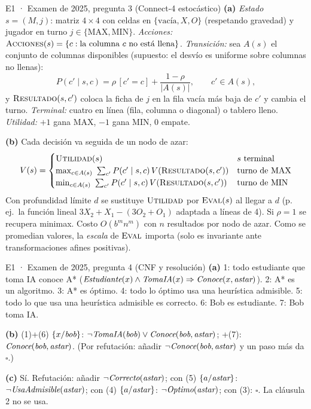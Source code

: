 \begin{solucion}{E1 · Examen de 2025, pregunta 3 (Connect-4 estocástico)}
\textbf{(a)} \emph{Estado} $s=(M,j)$: matriz $4\times4$ con celdas en $\{\text{vacía},X,O\}$ (respetando gravedad) y
jugador en turno $j\in\{\text{MAX},\text{MIN}\}$. \emph{Acciones:} $\textsc{Acciones}(s)=\{c: \text{la columna } c \text{ no está llena}\}$.
\emph{Transición:} sea $A(s)$ el conjunto de columnas disponibles (supuesto: el desvío es uniforme sobre
columnas no llenas):
\[P(c'\mid s,c)=\rho\,[c'=c]+\frac{1-\rho}{|A(s)|},\qquad c'\in A(s),\]
y $\textsc{Resultado}(s,c')$ coloca la ficha de $j$ en la fila vacía más baja de $c'$ y cambia el turno.
\emph{Terminal:} cuatro en línea (fila, columna o diagonal) o tablero lleno. \emph{Utilidad:} $+1$ gana MAX, $-1$
gana MIN, $0$ empate.

\textbf{(b)} Cada decisión va seguida de un nodo de azar:
\[V(s)=\begin{cases}
\textsc{Utilidad}(s) & s \text{ terminal}\\
\max_{c\in A(s)}\ \sum_{c'}P(c'\mid s,c)\,V(\textsc{Resultado}(s,c')) & \text{turno de MAX}\\
\min_{c\in A(s)}\ \sum_{c'}P(c'\mid s,c)\,V(\textsc{Resultado}(s,c')) & \text{turno de MIN}
\end{cases}\]
Con profundidad límite $d$ se sustituye $\textsc{Utilidad}$ por $\textsc{Eval}(s)$ al llegar a $d$ (p.\,ej.\ la
función lineal $3X_2+X_1-(3O_2+O_1)$ adaptada a líneas de 4). Si $\rho=1$ se recupera minimax. Costo
$O(b^m n^m)$ con $n$ resultados por nodo de azar. Como se promedian valores, la \emph{escala} de
$\textsc{Eval}$ importa (solo es invariante ante transformaciones afines positivas).
\end{solucion}

\begin{solucion}{E1 · Examen de 2025, pregunta 4 (CNF y resolución)}
\textbf{(a)} 1: todo estudiante que toma IA conoce A* ($\textit{Estudiante}(x)\wedge\textit{TomaIA}(x)\Rightarrow\textit{Conoce}(x,\textit{astar})$).
2: A* es un algoritmo. 3: A* es óptimo. 4: todo lo óptimo usa una heurística admisible. 5: todo lo
que usa una heurística admisible es correcto. 6: Bob es estudiante. 7: Bob toma IA.

\textbf{(b)} (1)+(6) $\{x/\textit{bob}\}$: $\neg\textit{TomaIA}(\textit{bob})\vee\textit{Conoce}(\textit{bob},\textit{astar})$; +(7): $\textit{Conoce}(\textit{bob},\textit{astar})$.
(Por refutación: añadir $\neg\textit{Conoce}(\textit{bob},\textit{astar})$ y un paso más da $\square$.)

\textbf{(c)} Sí. Refutación: añadir $\neg\textit{Correcto}(\textit{astar})$; con (5) $\{a/\textit{astar}\}$: $\neg\textit{UsaAdmisible}(\textit{astar})$;
con (4) $\{a/\textit{astar}\}$: $\neg\textit{Optimo}(\textit{astar})$; con (3): $\square$. La cláusula 2 no se usa.
\end{solucion}

